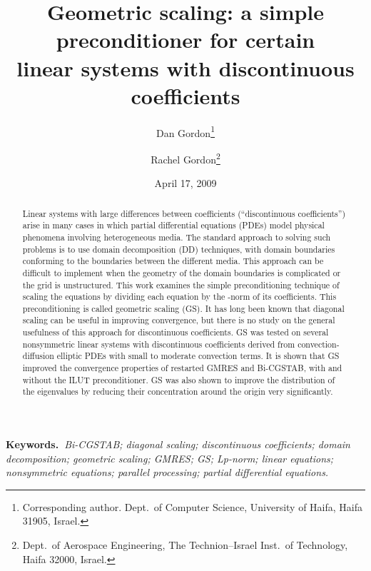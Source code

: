 \documentclass[12pt,a4paper]{article}
\newcommand{\keywords}[1]{{{\bf Keywords.~}{\em #1}}}
\newcounter{i}
\begin{document}
\baselineskip 14pt

\title{\vspace{-1.5cm}
\bf\Large
Geometric scaling: a simple preconditioner for certain\\
linear systems with discontinuous coefficients}

\author{Dan Gordon\thanks{Corresponding author. 
	Dept.\ of Computer Science,
        University of Haifa, Haifa 31905, Israel.
        \newline\hspace*{18pt}{\tt gordon@cs.haifa.ac.il}} 
	\and
        Rachel Gordon\thanks{Dept.\ of Aerospace Engineering,
        The Technion--Israel Inst.\ of Technology, Haifa 32000,
        Israel.\newline\hspace*{18pt}{\tt rgordon@tx.technion.ac.il}}}

\date{April 17, 2009}

\maketitle
\vspace{-1cm}
\begin{abstract}\noindent
Linear systems with large differences between coefficients 
(``discontinuous coefficients'') arise in many cases in which 
partial differential equations (PDEs) model physical phenomena 
involving heterogeneous media.  The standard approach to solving 
such problems is to use domain decomposition (DD) techniques, 
with domain boundaries conforming to the boundaries between the 
different media.  This approach can be difficult to implement 
when the geometry of the domain boundaries is complicated or 
the grid is unstructured.  This work examines the simple 
preconditioning technique of scaling the equations by dividing 
each equation by the -norm of its coefficients.  This 
preconditioning is called geometric scaling (GS).  
It has long been known that diagonal scaling can be useful in 
improving convergence, but there is no study on the general 
usefulness of this approach for discontinuous coefficients.  
GS was tested on several nonsymmetric linear systems with 
discontinuous coefficients derived from convection-diffusion 
elliptic PDEs with small to moderate convection terms.
It is shown that GS improved the convergence properties of 
restarted GMRES and Bi-CGSTAB, with and without the ILUT 
preconditioner.
GS was also shown to improve the distribution of the 
eigenvalues by reducing their concentration around the 
origin very significantly.
\end{abstract}
\keywords{Bi-CGSTAB; diagonal scaling; discontinuous coefficients; 
domain decomposition; geometric scaling; GMRES; GS; Lp-norm; linear 
equations; nonsymmetric equations; parallel processing; partial 
differential equations.}
\end{document}
